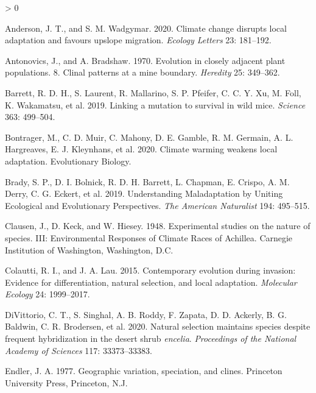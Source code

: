 \documentclass[
  12pt,
]{article}
\newlength{\cslhangindent}
\newenvironment{CSLReferences}[2] %
 {%
  \setlength{\parindent}{0pt}
  \ifodd #1 \everypar{\setlength{\hangindent}{\cslhangindent}}\ignorespaces\fi
  \ifnum #2 > 0
  \setlength{\parskip}{#2\baselineskip}
  \fi
 }%
 {}
\begin{document}
\hypertarget{refs}{}
\begin{CSLReferences}{1}{0}
\leavevmode\hypertarget{ref-anderson_climate_2020}{}%
Anderson, J. T., and S. M. Wadgymar. 2020. Climate change disrupts local adaptation and favours upslope migration. \emph{Ecology Letters} 23: 181--192.

\leavevmode\hypertarget{ref-antonovics_evolution_1970}{}%
Antonovics, J., and A. Bradshaw. 1970. Evolution in closely adjacent plant populations. 8. {Clinal} patterns at a mine boundary. \emph{Heredity} 25: 349--362.

\leavevmode\hypertarget{ref-barrett_linking_2019}{}%
Barrett, R. D. H., S. Laurent, R. Mallarino, S. P. Pfeifer, C. C. Y. Xu, M. Foll, K. Wakamatsu, et al. 2019. Linking a mutation to survival in wild mice. \emph{Science} 363: 499--504.

\leavevmode\hypertarget{ref-bontrager_climate_2020}{}%
Bontrager, M., C. D. Muir, C. Mahony, D. E. Gamble, R. M. Germain, A. L. Hargreaves, E. J. Kleynhans, et al. 2020. Climate warming weakens local adaptation. Evolutionary Biology.

\leavevmode\hypertarget{ref-brady_understanding_2019}{}%
Brady, S. P., D. I. Bolnick, R. D. H. Barrett, L. Chapman, E. Crispo, A. M. Derry, C. G. Eckert, et al. 2019. Understanding {Maladaptation} by {Uniting} {Ecological} and {Evolutionary} {Perspectives}. \emph{The American Naturalist} 194: 495--515.

\leavevmode\hypertarget{ref-clausen_experimental_1948}{}%
Clausen, J., D. Keck, and W. Hiesey. 1948. Experimental studies on the nature of species. {III}: {Environmental} {Responses} of {Climate} {Races} of {Achillea}. Carnegie Institution of Washington, Washington, D.C.

\leavevmode\hypertarget{ref-colautti_contemporary_2015}{}%
Colautti, R. I., and J. A. Lau. 2015. Contemporary evolution during invasion: Evidence for differentiation, natural selection, and local adaptation. \emph{Molecular Ecology} 24: 1999--2017.

\leavevmode\hypertarget{ref-divittorio_natural_2020}{}%
DiVittorio, C. T., S. Singhal, A. B. Roddy, F. Zapata, D. D. Ackerly, B. G. Baldwin, C. R. Brodersen, et al. 2020. Natural selection maintains species despite frequent hybridization in the desert shrub \emph{encelia}. \emph{Proceedings of the National Academy of Sciences} 117: 33373--33383.

\leavevmode\hypertarget{ref-endler_geographic_1977}{}%
Endler, J. A. 1977. Geographic variation, speciation, and clines. Princeton University Press, Princeton, N.J.


\end{CSLReferences}
\end{document}
